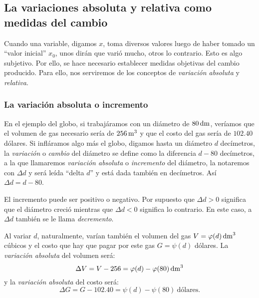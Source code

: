 \subsection{La variaciones absoluta y relativa como medidas del cambio}
Cuando una variable, digamos $x$, toma diversos valores luego de haber tomado un ``valor inicial''
$x_0$, unos dirán que varió mucho, otros lo contrario. Esto es algo subjetivo. Por ello, se hace
necesario establecer medidas objetivas del cambio producido. Para ello, nos serviremos de los
conceptos de \emph{variación absoluta} y \emph{relativa}.

\subsubsection{La variación absoluta o incremento}
En el ejemplo del globo, si trabajáramos con un diámetro de $80\operatorname{dm}$, veríamos que el volumen de gas
necesario sería de $256\operatorname{m}^3$ y que el costo del gas sería de $102.40$ dólares. Si infláramos
algo más el globo, digamos hasta un diámetro $d$ decímetros, la \emph{variación} o \emph{cambio}
del diámetro se define como la diferencia $d-80$ decímetros, a la que llamaremos \emph{variación
absoluta} o \emph{incremento} del diámetro, la notaremos con $\Delta d$ y será leída ``delta $d$''
y está dada también en decímetros. Así $\Delta d = d-80$.

El incremento puede ser positivo o negativo. Por supuesto que $\Delta d > 0$ significa que el
diámetro creció mientras que $\Delta d < 0$ significa lo contrario. En este caso, a $\Delta d$
también se le llama \emph{decremento}.

Al variar $d$, naturalmente, varían también el volumen del gas $V = \varphi(d)\operatorname{dm}^3$ cúbicos y el
costo que hay que pagar por este gas $G = \psi(d)$ dólares. La \emph{variación absoluta} del
volumen será:
\[
\Delta V = V - 256 = \varphi(d) - \varphi(80)\operatorname{dm}^3
\]
y la \emph{variación absoluta} del costo será:
\[
\Delta G = G - 102.40 = \psi(d) - \psi(80)\ \text{dólares}.
\]

